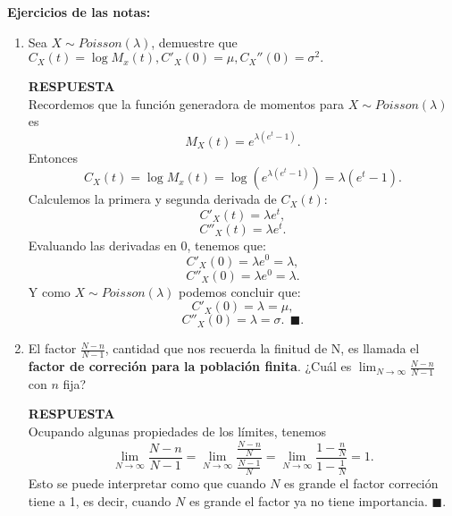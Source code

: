 \documentclass[11pt,letterpaper]{article}
\newcommand{\res}{\textbf{RESPUESTA}\\}
\newcommand{\finf}{\blacksquare.}
\begin{document}
\textbf{Ejercicios de las notas: }
\begin{enumerate}
\item Sea $X\sim Poisson(\lambda)$, demuestre que $C_X(t)=\log M_x(t), C'_X(0)=\mu, C_X''(0)=\sigma^2.$

\res
Recordemos que la función generadora de momentos para $X\sim Poisson(\lambda)$ es
$$M_X(t)=e^{\lambda(e^t-1)}.$$
Entonces
$$C_X(t)=\log M_x(t) = \log (e^{\lambda(e^t-1)})=\lambda(e^t-1).$$
Calculemos la primera y segunda derivada de $C_X(t):$
$$C'_X(t)=\lambda e^t,$$
$$C''_X(t)=\lambda e^t.$$
Evaluando las derivadas en 0, tenemos que:
$$C'_X(0)=\lambda e^0=\lambda,$$
$$C''_X(0)=\lambda e^0=\lambda.$$
Y como $X\sim Poisson(\lambda)$ podemos concluir que:
$$C'_X(0)=\lambda=\mu,$$
$$C''_X(0)=\lambda=\sigma.\ \ \finf$$
\item El factor $\frac{N-n}{N-1}$, cantidad que nos recuerda la finitud de N, es llamada el \textbf{factor de correción para la población finita}. ¿Cuál es $\lim_{N\rightarrow\infty}\frac{N-n}{N-1}$ con $n$ fija?

\res
Ocupando algunas propiedades de los límites, tenemos
$$\lim_{N\rightarrow\infty}\frac{N-n}{N-1}=\lim_{N\rightarrow\infty}\frac{\frac{N-n}{N}}{\frac{N-1}{N}}=\lim_{N\rightarrow\infty}\frac{1-\frac{n}{N}}{1-\frac{1}{N}}=1.$$
Esto se puede interpretar como que cuando $N$ es grande el factor correción tiene a 1, es decir, cuando $N$ es grande el factor ya no tiene importancia. $\finf$
\end{enumerate}
\end{document}
